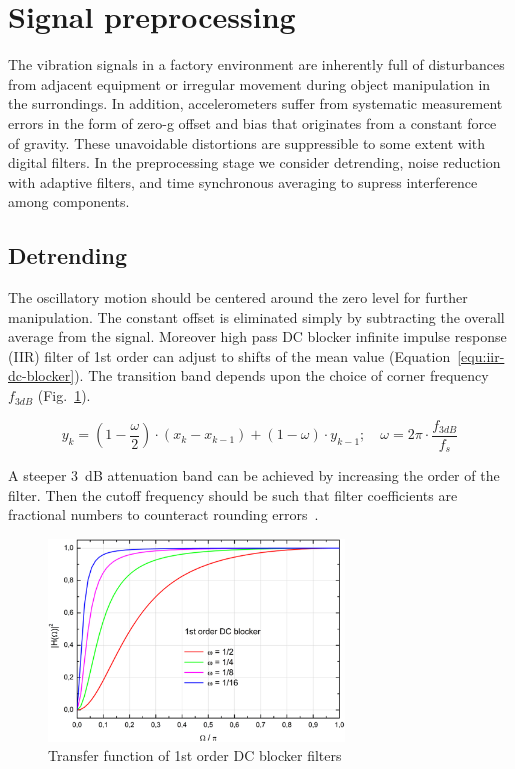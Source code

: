 \section{Signal preprocessing}
The vibration signals in a factory environment are inherently full of disturbances from adjacent equipment or irregular movement during object manipulation in the surrondings. In addition, accelerometers suffer from systematic measurement errors in the form of zero-g offset and bias that originates from a constant force of gravity. These unavoidable distortions are suppressible to some extent with digital filters. In the preprocessing stage we consider detrending, noise reduction with adaptive filters, and time synchronous averaging to supress interference among components.

\subsection{Detrending}
The oscillatory motion should be centered around the zero level for further manipulation. The constant offset is eliminated simply by subtracting the overall average from the signal. Moreover high pass DC blocker infinite impulse response (IIR) filter of 1st order can adjust to shifts of the mean value (Equation~\ref{equ:iir-dc-blocker}). The transition band depends upon the choice of corner frequency $f_{3dB}$ (Fig.~\ref{fig:dc-blocker}).

\begin{equation} \label{equ:iir-dc-blocker}
y_k = (1 - \frac{\omega}{2}) \cdot (x_k  -  x_{k - 1}) + (1 - \omega) \cdot y_{k - 1}; \quad \omega = 2\pi \cdot \frac{f_{3dB}}{f_s}
\end{equation}

A steeper 3~dB attenuation band can be achieved by increasing the order of the filter. Then the cutoff frequency should be such that filter coefficients are fractional numbers to counteract rounding errors~\cite{tittelbach-helmrich_digital_2021}.

\begin{figure}[h]
	\centering
	\includegraphics[width=0.7\textwidth]{assets/iir-1-dc-blocker-band.jpg}
	\caption{Transfer function of 1st order DC blocker filters ~\cite{tittelbach-helmrich_digital_2021}}
	\label{fig:dc-blocker}
\end{figure}

